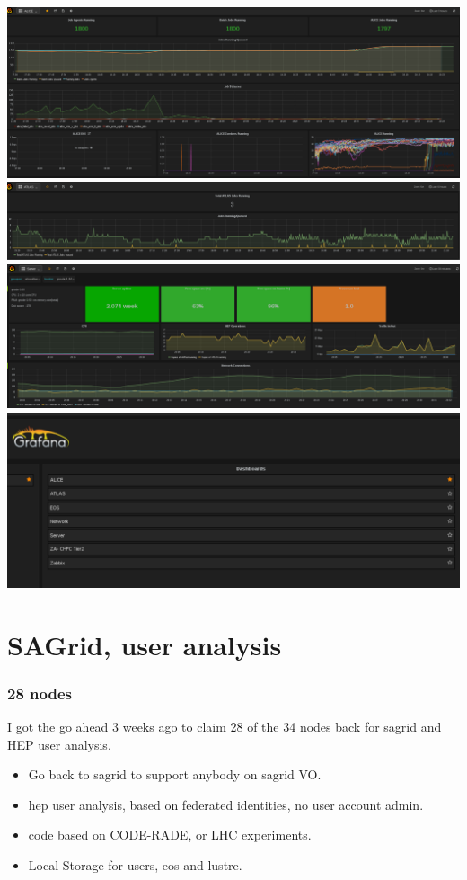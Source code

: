 \documentclass{beamer}
\begin{document}
\begin{frame}
  \includegraphics[scale=0.25]{ALICEProcessing-Grafana.pdf}
  \includegraphics[scale=0.25]{ATLASProcessing-Grafana.pdf}
  \includegraphics[scale=0.25]{Server50-Grafana.pdf}
  \includegraphics[scale=0.25]{GrafanaMenu.pdf}
\end{frame}


\section{SAGrid, user analysis}
\begin{frame}
\frametitle{28 nodes}
I got the go ahead 3 weeks ago to claim 28 of the 34 nodes back for sagrid and HEP user analysis.
\begin{itemize}
  \item Go back to sagrid to support anybody on sagrid VO.
  \item hep user analysis, based on federated identities, no user account admin.
  \item code based on CODE-RADE, or LHC experiments.
  \item Local Storage for users, eos and lustre.
\end{itemize}
\end{frame}
\end{document}
